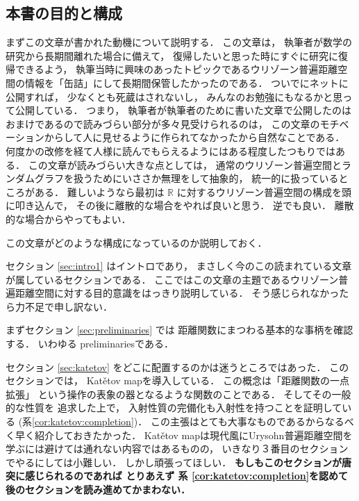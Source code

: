 \documentclass[leqno, 12pt]{jsarticle}
\newcommand{\rr}{\mathbb{R}}
\DeclareRobustCommand{\mustreadtoc}[1]{\textbf{【必読】#1}}
\def\mustreadtoc#1{【必読】#1}%
\begin{document}
\subsection[\mustreadtoc{本書の目的と構成}]{本書の目的と構成}\label{subsec:intro:guide}

まずこの文章が書かれた動機について説明する．
この文章は，%
執筆者が数学の研究から長期間離れた場合に備えて，%
復帰したいと思った時にすぐに研究に復帰できるよう，%
執筆当時に興味のあったトピックであるウリゾーン普遍距離空間の情報を「缶詰」にして長期間保管したかったのである．%
ついでにネットに公開すれば，%
少なくとも死蔵はされないし，%
みんなのお勉強にもなるかと思って公開している．%
つまり，%
執筆者が執筆者のために書いた文章で公開したのはおまけであるので読みづらい部分が多々見受けられるのは，%
この文章のモチベーションからして人に見せるように作られてなかったから自然なことである．%
何度かの改修を経て人様に読んでもらえるようにはある程度したつもりではある．
この文章が読みづらい大きな点としては，%
通常のウリゾーン普遍空間とランダムグラフを扱うためにいささか無理をして抽象的，%
統一的に扱っているところがある．
難しいようなら最初は%
$\rr$%
に対するウリゾーン普遍空間の構成を頭に叩き込んで，%
その後に離散的な場合をやれば良いと思う．%
逆でも良い．%
離散的な場合からやってもよい．


この文章がどのような構成になっているのか説明しておく．


セクション
\ref{sec:intro1}
はイントロであり，%
まさしく今のこの読まれている文章が属しているセクションである．%
ここではこの文章の主題であるウリゾーン普遍距離空間に対する目的意識をはっきり説明している．
そう感じられなかったら力不足で申し訳ない．

まずセクション
\ref{sec:preliminaries}
では
距離関数にまつわる基本的な事柄を確認する．
いわゆる
preliminariesである．

セクション
\ref{sec:katetov}
をどこに配置するのかは迷うところではあった．
このセクションでは，
Kat\v{e}tov mapを導入している．
この概念は「距離関数の一点拡張」
という操作の表象の器となるような関数のことである．
そしてその一般的な性質を
追求した上で，%
入射性質の完備化も入射性を持つことを証明している
(系\ref{cor:katetov:completion})．
この主張はとても大事なものであるからなるべく早く紹介しておきたかった．
Kat\v{e}tov mapは現代風にUrysohn普遍距離空間を学ぶには避けては通れない内容ではあるものの，%
いきなり３番目のセクションでやるにしては小難しい．%
しかし頑張ってほしい．
\textbf{もしもこのセクションが唐突に感じられるのであれば
とりあえず
系
\ref{cor:katetov:completion}を認めて後のセクションを読み進めてかまわない．%
}
\end{document}
